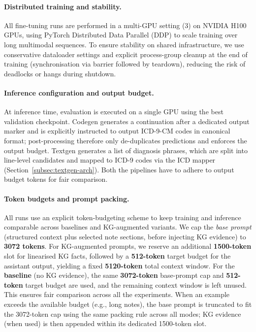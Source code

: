 \paragraph{Distributed training and stability.}
All fine-tuning runs are performed in a multi-GPU setting (3) on NVIDIA H100 GPUs, using PyTorch Distributed Data Parallel (DDP) to scale training over long multimodal sequences. To ensure stability on shared infrastructure, we use conservative dataloader settings and explicit process-group cleanup at the end of training (synchronisation via barrier followed by teardown), reducing the risk of deadlocks or hangs during shutdown.

\paragraph{Inference configuration and output budget.}
At inference time, evaluation is executed on a single GPU using the best validation checkpoint. Codegen generates a continuation after a dedicated output marker and is explicitly instructed to output ICD-9-CM codes in canonical format; post-processing therefore only de-duplicates predictions and enforces the output budget. Textgen generates a list of diagnosis phrases, which are split into line-level candidates and mapped to ICD-9 codes via the ICD mapper (Section~\ref{subsec:textgen-arch}). Both the pipelines have to adhere to output budget tokens for fair comparison.

\paragraph{Token budgets and prompt packing.}
All runs use an explicit token-budgeting scheme to keep training and inference comparable across baselines and KG-augmented variants. We cap the \emph{base prompt} (structured context plus selected note sections, before injecting KG evidence) to \textbf{3072 tokens}. For KG-augmented prompts, we reserve an additional \textbf{1500-token} slot for linearised KG facts, followed by a \textbf{512-token} target budget for the assistant output, yielding a fixed \textbf{5120-token} total context window. For the \textbf{baseline} (no KG evidence), the same \textbf{3072-token} base-prompt cap and \textbf{512-token} target budget are used, and the remaining context window is left unused. This ensures fair comparison across all the experiments. When an example exceeds the available budget (e.g., long notes), the base prompt is truncated to fit the 3072-token cap using the same packing rule across all modes; KG evidence (when used) is then appended within its dedicated 1500-token slot.

